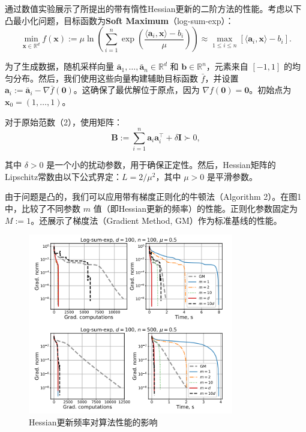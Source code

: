 \documentclass[a4paper,twoside,AutoFakeBold]{article}
\theoremstyle{definition}
\begin{document}
通过数值实验展示了所提出的带有惰性Hessian更新的二阶方法的性能。考虑以下凸最小化问题，目标函数为\textbf{Soft Maximum}（log-sum-exp）：
\[
\min_{\mathbf{x} \in \mathbb{R}^{d}} f(\mathbf{x}) := \mu \ln \left( \sum_{i=1}^{n} \exp \left( \frac{\langle \mathbf{a}_{i}, \mathbf{x} \rangle - b_{i}}{\mu} \right) \right) \approx \max_{1 \leq i \leq n} \left[ \langle \mathbf{a}_{i}, \mathbf{x} \rangle - b_{i} \right].
\]

为了生成数据，随机采样向量 \(\bar{\mathbf{a}}_{1}, \ldots, \bar{\mathbf{a}}_{n} \in \mathbb{R}^{d}\) 和 \(\mathbf{b} \in \mathbb{R}^{n}\)，元素来自 \([-1, 1]\) 的均匀分布。然后，我们使用这些向量构建辅助目标函数 \(\bar{f}\)，并设置 \(\mathbf{a}_{i} := \bar{\mathbf{a}}_{i} - \nabla \bar{f}(\mathbf{0})\)。这确保了最优解位于原点，因为 \(\nabla f(\mathbf{0}) = \mathbf{0}\)。初始点为 \(\mathbf{x}_{0} = (1, \ldots, 1)\)。

对于原始范数（2），使用矩阵：
\[
\mathbf{B} := \sum_{i=1}^{n} \mathbf{a}_{i} \mathbf{a}_{i}^{\top} + \delta \mathbf{I} \succ 0,
\]

其中 \(\delta > 0\) 是一个小的扰动参数，用于确保正定性。然后，Hessian矩阵的Lipschitz常数由以下公式界定：\(L = 2 / \mu^{2}\)，其中 \(\mu > 0\) 是平滑参数。

由于问题是凸的，我们可以应用带有梯度正则化的牛顿法（Algorithm 2）。在图1中，比较了不同参数 \(m\) 值（即Hessian更新的频率）的性能。正则化参数固定为 \(M := 1\)。还展示了梯度法（Gradient Method, GM）作为标准基线的性能。

\begin{figure}[H]
    \centering
    \includegraphics[width=0.8\textwidth]{figs/1.png}
    \caption{Hessian更新频率对算法性能的影响}
    \label{fig:fig1}
\end{figure}
\end{document}
